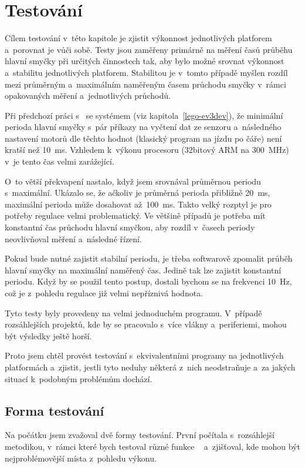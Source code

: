 \chapter{Testování}
\label{testing}

Cílem testování v~této kapitole je zjistit výkonnost jednotlivých platforem a~porovnat je vůči sobě. 
Testy jsou zaměřeny primárně na měření časů průběhu hlavní smyčky při určitých činnostech tak, aby bylo možné srovnat výkonnost a~stabilitu jednotlivých platforem. 
Stabilitou je v~tomto případě myšlen rozdíl mezi průměrným a~maximálním naměřeným časem průchodu smyčky v~rámci opakovaných měření a~jednotlivých průchodů.

Při předchozí práci s~\EVthree{ } se systémem \evThreeDev (viz kapitola~\ref{lego-ev3dev}), že minimální perioda hlavní smyčky s~pár příkazy na vyčtení dat ze senzoru a~následného nastavení motorů dle těchto hodnot (klasický program na jízdu po čáře) není kratší než 10~ms. 
Vzhledem k~výkonu procesoru (32bitový ARM na 300~MHz) v~\EVthree{ }je tento čas velmi zarážející. 

O~to větší překvapení nastalo, když jsem srovnával průměrnou periodu s~maximální. Ukázalo se, že ačkoliv je průměrná perioda přibližně 20~ms, maximální perioda může dosahovat až~100~ms. 
Takto velký rozptyl je pro potřeby regulace velmi problematický. 
Ve většině případů je potřeba mít konstantní čas průchodu hlavní smyčkou, aby rozdíl v~časech periody neovlivňoval měření a~následné řízení. 

Pokud bude nutné zajistit stabilní periodu, je třeba softwarově zpomalit průběh hlavní smyčky na maximální naměřený čas. 
Jedině tak lze zajistit konstantní periodu. 
Když by se použil tento postup, dostali bychom se na frekvenci 10~Hz, což je z~pohledu regulace již velmi nepříznivá hodnota.

Tyto testy byly provedeny na velmi jednoduchém programu. 
V~případě rozsáhlejších projektů, kde by se pracovalo s~více vlákny a~periferiemi, mohou být výsledky ještě horší.

Proto jsem chtěl provést testování s~ekvivalentními programy na jednotlivých platformách a~zjistit, jestli tyto neduhy některá z~nich neodstraňuje a~za jakých situací k~podobným problémům dochází.

\section{Forma testování}

Na počátku jsem zvažoval dvě formy testování. První počítala s~rozsáhlejší metodikou, v~rámci které bych testoval různé funkce \EVthree{}~ a~zjišťoval, kde mohou být nejproblémovější místa z~pohledu výkonu. \\


